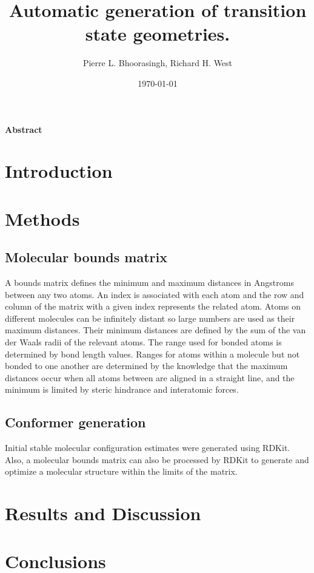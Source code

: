 \documentclass[11pt]{article}
\begin{document}
\title{Automatic generation of transition state geometries.}
\author{Pierre L. Bhoorasingh, Richard H. West}
\date{\today}
\maketitle

\newpage
\paragraph{Abstract}

\newpage
\section{Introduction}

\section{Methods}

\subsection{Molecular bounds matrix}
A bounds matrix defines the minimum and maximum distances in Angstroms between any two atoms. An index is associated with each atom and the row and column of the matrix with a given index represents the related atom. Atoms on different molecules can be infinitely distant so large numbers are used as their maximum distances. Their minimum distances are defined by the sum of the van der Waals radii of the relevant atoms. The range used for bonded atoms is determined by bond length values. Ranges for atoms within a molecule but not bonded to one another are determined by the knowledge that the maximum distances occur when all atoms between are aligned in a straight line, and the minimum is limited by steric hindrance and interatomic forces.

\subsection{Conformer generation}
Initial stable molecular configuration estimates were generated using RDKit. Also, a molecular bounds matrix can also be processed by RDKit to generate and optimize a molecular structure within the limits of the matrix.

\section{Results and Discussion}

\section{Conclusions}
\end{document}
